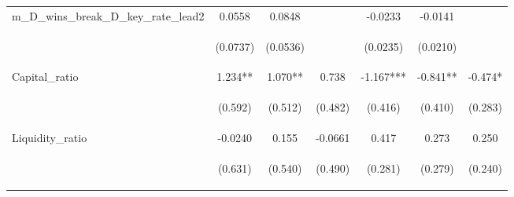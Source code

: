 \documentclass[]{article}
\begin{document}
\begin{center}
\begin{tabular}{lcccccc}
m\_D\_wins\_break\_D\_key\_rate\_lead2 & 0.0558 & 0.0848 &  & -0.0233 & -0.0141 &  \\
\vspace{4pt} & \begin{footnotesize}(0.0737)\end{footnotesize} & \begin{footnotesize}(0.0536)\end{footnotesize} & \begin{footnotesize}\end{footnotesize} & \begin{footnotesize}(0.0235)\end{footnotesize} & \begin{footnotesize}(0.0210)\end{footnotesize} & \begin{footnotesize}\end{footnotesize} \\
Capital\_ratio & 1.234** & 1.070** & 0.738 & -1.167*** & -0.841** & -0.474* \\
\vspace{4pt} & \begin{footnotesize}(0.592)\end{footnotesize} & \begin{footnotesize}(0.512)\end{footnotesize} & \begin{footnotesize}(0.482)\end{footnotesize} & \begin{footnotesize}(0.416)\end{footnotesize} & \begin{footnotesize}(0.410)\end{footnotesize} & \begin{footnotesize}(0.283)\end{footnotesize} \\
Liquidity\_ratio & -0.0240 & 0.155 & -0.0661 & 0.417 & 0.273 & 0.250 \\
\vspace{4pt} & \begin{footnotesize}(0.631)\end{footnotesize} & \begin{footnotesize}(0.540)\end{footnotesize} & \begin{footnotesize}(0.490)\end{footnotesize} & \begin{footnotesize}(0.281)\end{footnotesize} & \begin{footnotesize}(0.279)\end{footnotesize} & \begin{footnotesize}(0.240)\end{footnotesize} \\

\end{tabular}
\end{center}
\end{document}
